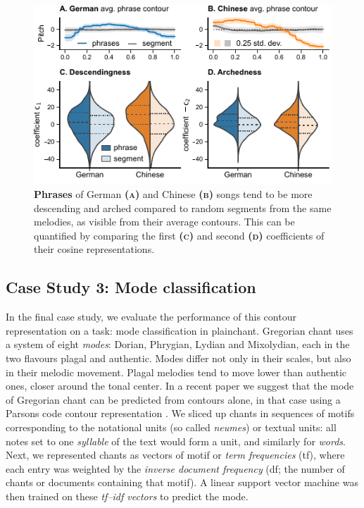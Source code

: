 \documentclass{article}
\newcommand{\subfiglabel}[1]{\textbf{\textsc{#1}}}
\begin{document}
\begin{figure}[t]
    \centering
    \includegraphics{figs/fig05-melodic-arch.pdf}
    \caption{\textbf{Phrases} of German \subfiglabel{(a)} and Chinese \subfiglabel{(b)} songs tend to be more descending and arched compared to random segments from the same melodies, as visible from their average contours.
    This can be quantified by comparing the first \subfiglabel{(c)} and second \subfiglabel{(d)} coefficients of their cosine representations.}
    \label{fig:melodic-arch}
\end{figure}


\subsection{Case Study 3: Mode classification}


In the final case study, we evaluate the performance of this contour representation on a task: mode classification in plainchant.
Gregorian chant uses a system of eight \emph{modes}: Dorian, Phrygian, Lydian and Mixolydian, each in the two flavours plagal and authentic.
Modes differ not only in their scales, but also in their melodic movement.
Plagal melodies tend to move lower than authentic ones, closer around the tonal center.
In a recent paper we suggest that the mode of Gregorian chant can be predicted from contours alone, in that case using a Parsons code contour representation \cite{Cornelissen2020ISMIR}.
We sliced up chants in sequences of motifs corresponding to the notational units (so called \emph{neumes}) or textual units: all notes set to one \emph{syllable} of the text would form a unit, and similarly for \emph{words}.
Next, we represented chants as vectors of motif or \emph{term frequencies} (tf), where each entry was weighted by the \emph{inverse document frequency} (df; the number of chants or documents containing that motif).
A linear support vector machine was then trained on these \emph{tf--idf vectors} to predict the mode.
\end{document}
